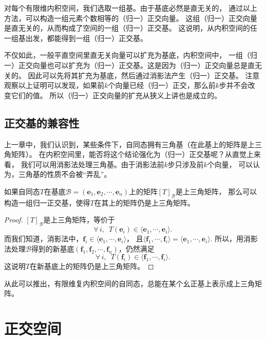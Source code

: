 \documentclass[12pt,UTF8,fontset=none]{ctexbook}
\begin{document}
对每个有限维内积空间，我们选取一组基。由于基底必然是直无关的，
通过以上方法，可以构造一组元素个数相等的（归一）正交向量。
这组（归一）正交向量是直无关的，从而构成了空间的一组（归一）正交基。
这说明，从内积空间的任一组基出发，都能得到一组（归一）正交基。

不仅如此，一般平直空间里直无关向量可以扩充为基底，内积空间中，
一组（归一）正交向量也可以扩充为（归一）正交基。这是因为（归一）正交向量总是直无关的。
因此可以先将其扩充为基底，然后通过消影法产生（归一）正交基。
注意观察以上证明可以发现，如果前$k$个向量已经（归一）正交，那么前$k$步并不会改变它们的值。
所以（归一）正交向量的扩充从狭义上讲也是成立的。

\subsection{正交基的兼容性}
上一章中，我们认识到，某些条件下，自同态拥有三角基（在此基上的矩阵是上三角矩阵）。
在内积空间里，能否将这个结论强化为（归一）正交基呢？从直觉上来看，
我们可以用消影法处理三角基。由于消影法前$k$步只涉及前$k$个向量，
可以认为，三角基的性质不会被“弄乱”。

\begin{pp}\label{pp:7_6}
    如果自同态$T$在基底$\mathcal{B} = (\mathbf{e}_1, \mathbf{e}_2, \cdots , \mathbf{e}_n)$上的矩阵$[T]_\mathcal{B}$是上三角矩阵，
    那么可以构造一组归一正交基，使得$T$在其上的矩阵仍是上三角矩阵。
\end{pp}

\begin{proof} %
    $[T]_\mathcal{B}$是上三角矩阵，等价于
    $$\forall \, i, \,\,\, T(\mathbf{e}_i) \in \langle \mathbf{e}_1, \cdots , \mathbf{e}_i \rangle.$$ 
    而我们知道，消影法中，$\mathbf{f}_i \in \langle \mathbf{e}_1, \cdots , \mathbf{e}_i \rangle$，
    且$\langle \mathbf{f}_1, \cdots , \mathbf{f}_i \rangle = \langle \mathbf{e}_1, \cdots , \mathbf{e}_i \rangle.$ 
    所以，用消影法处理$\mathcal{B}$得到的新基底$(\mathbf{f}_1, \mathbf{f}_2, \cdots , \mathbf{f}_n)$，仍然满足
    $$\forall \, i, \,\,\, T(\mathbf{f}_i) \in \langle \mathbf{f}_1, \cdots , \mathbf{f}_i \rangle.$$
    这说明$T$在新基底上的矩阵仍是上三角矩阵。

\end{proof}


从此可以推出，有限维复内积空间的自同态，总能在某个幺正基上表示成上三角矩阵。

\section{正交空间}
\end{document}
